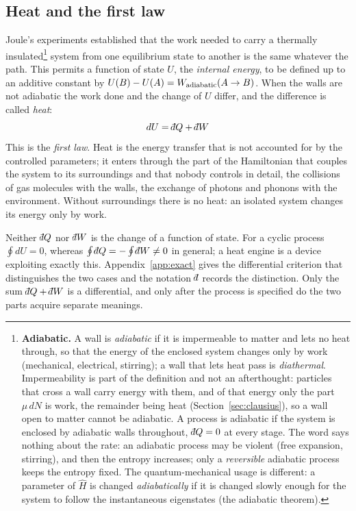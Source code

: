 \documentclass[10pt,a4paper]{article}
\theoremstyle{remark}
\newcommand{\dbar}{\mathchar'26\mkern-11mu d}
\begin{document}
\subsection{Heat and the first law}
\label{sec:firstlaw}

Joule's experiments established that the work needed to carry a thermally
insulated\footnote{\label{fn:adiabatic}%
\textbf{Adiabatic.} A wall is \emph{adiabatic} if it is impermeable to
matter and lets no heat through, so that the energy of the enclosed system
changes only by work (mechanical, electrical, stirring); a wall that lets heat
pass is \emph{diathermal}. Impermeability is part of the definition and not an
afterthought: particles that cross a wall carry energy with them, and of that
energy only the part $\mu\,dN$ is work, the remainder being heat
(Section~\ref{sec:clausius}), so a wall open to matter cannot be adiabatic. A
process is adiabatic if the system is enclosed by adiabatic walls throughout,
$\dbar Q=0$ at every stage. The word says nothing about the rate: an adiabatic
process may be violent (free expansion, stirring), and then the entropy
increases; only a \emph{reversible} adiabatic process keeps the entropy fixed.
The quantum-mechanical usage is different: a parameter of $\hat H$ is changed
\emph{adiabatically} if it is changed slowly enough for the system to follow
the instantaneous eigenstates (the adiabatic theorem).} system from one
equilibrium state to another is the same whatever the path. This permits a
function of state $U$, the \emph{internal energy}, to be defined up to an
additive constant by $U(B)-U(A)=W_{\rm adiabatic}(A\to B)$. When the walls are
not adiabatic the work done and the change of $U$ differ, and the difference is
called \emph{heat}:
\[
\;dU = \dbar Q + \dbar W\
\]
This is the \emph{first law}. Heat is the energy transfer that is not
accounted for by the controlled parameters; it enters through the part of the
Hamiltonian that couples the system to its surroundings and that nobody
controls in detail, the collisions of gas molecules with the walls, the
exchange of photons and phonons with the environment. Without surroundings
there is no heat: an isolated system changes its energy only by work.

Neither $\dbar Q$ nor $\dbar W$ is the change of a function of state. For a
cyclic process $\oint dU=0$, whereas $\oint\dbar Q=-\oint\dbar W\neq0$ in
general; a heat engine is a device exploiting exactly this. Appendix~\ref{app:exact}
gives the differential criterion that distinguishes the two cases and the
notation $\dbar$ records the distinction. Only the sum $\dbar Q+\dbar W$ is a
differential, and only after the process is specified do the two parts acquire
separate meanings.
\end{document}
